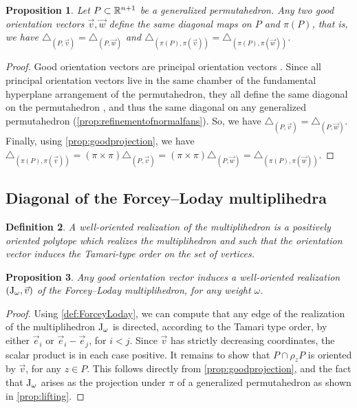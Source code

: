 \documentclass[twoside, 12pt]{amsart}
\newtheorem{definition}{Definition}[section]
\newtheorem{proposition}[definition]{Proposition}
\theoremstyle{remark}
\begin{document}
\begin{proposition}
Let $P\subset\mathbb{R}^{n+1}$ be a generalized permutahedron. 
Any two good orientation vectors $\vec v, \vec w$ define the same diagonal maps on $P$ and $\pi(P)$, that is, we have $\triangle_{(P,\vec v)}=\triangle_{(P,\vec w)}$ and $\triangle_{(\pi(P),\pi(\vec v))}=\triangle_{(\pi(P),\pi(\vec w))}$.
\end{proposition}
\begin{proof}
Good orientation vectors are principal orientation vectors \cite[Definition 3.15]{LA21}. Since all principal orientation vectors live in the same chamber of the fundamental hyperplane arrangement of the permutahedron, they all define the same diagonal on the permutahedron \cite[Proposition 1.21]{LA21}, and thus the same diagonal on any generalized permutahedron (\cref{prop:refinementofnormalfans}). So, we have $\triangle_{(P,\vec v)}=\triangle_{(P,\vec w)}$. Finally, using \cref{prop:goodprojection}, we have $\triangle_{(\pi(P),\pi(\vec v))}=(\pi \times \pi)\triangle_{(P,\vec v)}=(\pi \times \pi)\triangle_{(P,\vec w)}=\triangle_{(\pi(P),\pi(\vec w))}$. 
\end{proof}

\subsection{Diagonal of the Forcey--Loday multiplihedra}
\label{sec:diagonal}

\begin{definition}
A \emph{well-oriented realization of the multiplihedron} is a positively oriented polytope which realizes the multiplihedron and such that the orientation vector induces the Tamari-type order on the set of vertices. 
\end{definition}

\begin{proposition}
\label{prop:OrientationVector}
Any good orientation vector induces a well-oriented realization $\left( \mathrm{J}_\omega, \vec v \right)$ of the Forcey--Loday multiplihedron, for any weight $\omega$. 
\end{proposition}

\begin{proof}
Using \cref{def:ForceyLoday}, we can compute that any edge of the realization of the multiplihedron $\mathrm{J}_\omega$ is directed, according to the Tamari type order, by either $\vec e_i$ or $\vec e_i-\vec e_j$, for $i<j$.
Since $\vec v$ has strictly decreasing coordinates, the scalar product is in each case positive. 
It remains to show that $P\cap\rho_z P$ is oriented by $\vec v$, for any $z \in P$. 
This follows directly from \cref{prop:goodprojection}, and the fact that $\mathrm{J}_\omega$ arises as the projection under $\pi$ of a generalized permutahedron as shown in  \cref{prop:lifting}.
\end{proof}
\end{document}
